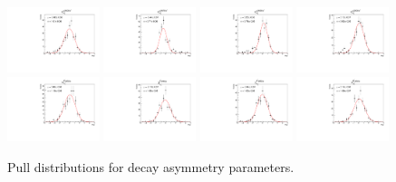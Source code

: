 \begin{figure}[h]
    \includegraphics[width=0.24\textwidth]{figure/io/alpha/pull_alpha_Lambda_1600_0.pdf}
    \includegraphics[width=0.24\textwidth]{figure/io/alpha/pull_alpha_Lambda_1670_0.pdf}
    \includegraphics[width=0.24\textwidth]{figure/io/alpha/pull_alpha_Lambda_1690_0.pdf}
    \includegraphics[width=0.24\textwidth]{figure/io/alpha/pull_alpha_Lambda_2000_0.pdf}
    \includegraphics[width=0.24\textwidth]{figure/io/alpha/pull_alpha_alpha_K_892_0.pdf}
    \includegraphics[width=0.24\textwidth]{figure/io/alpha/pull_alpha_beta_K_892_0.pdf}
    \includegraphics[width=0.24\textwidth]{figure/io/alpha/pull_alpha_gamma_K_892_0.pdf}
    \includegraphics[width=0.24\textwidth]{figure/io/alpha/pull_alpha_lambda_K_892_0.pdf}
    \caption{Pull distributions for decay asymmetry parameters.}
\label{fig:io_pull_asymmetry}
\end{figure}

